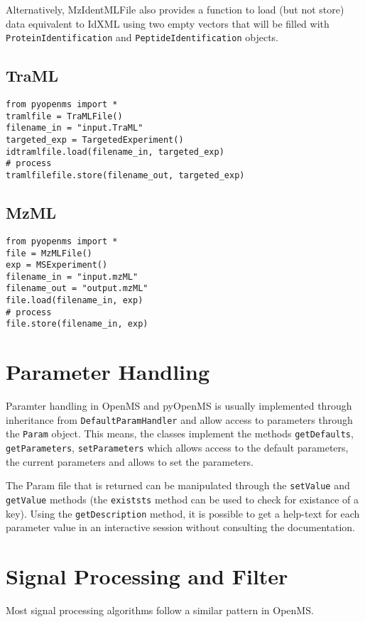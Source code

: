 \documentclass[10pt]{article}
\begin{document}
Alternatively, MzIdentMLFile also provides a function to load (but not store)
data equivalent to IdXML using two empty vectors that will be filled with
\texttt{ProteinIdentification} and \texttt{PeptideIdentification} objects.

\subsection{TraML}
\begin{verbatim}
from pyopenms import *
tramlfile = TraMLFile() 
filename_in = "input.TraML"
targeted_exp = TargetedExperiment()
idtramlfile.load(filename_in, targeted_exp)
# process 
tramlfilefile.store(filename_out, targeted_exp)
\end{verbatim}

\subsection{MzML}
\begin{verbatim}
from pyopenms import *
file = MzMLFile() 
exp = MSExperiment() 
filename_in = "input.mzML"
filename_out = "output.mzML"
file.load(filename_in, exp)
# process 
file.store(filename_in, exp)
\end{verbatim}

\pagebreak
\section{Parameter Handling}

Paramter handling in OpenMS and pyOpenMS is usually implemented through
inheritance from \texttt{DefaultParamHandler} and allow access to parameters
through the \texttt{Param} object. This means, the classes implement the
methods \texttt{getDefaults}, \texttt{getParameters}, \texttt{setParameters}
which allows access to the default parameters, the current parameters and
allows to set the parameters.

The Param file that is returned can be manipulated through the \texttt{setValue} and
\texttt{getValue} methods (the \texttt{existsts} method can be used to check for existance of a
key). Using the \texttt{getDescription} method, it is possible to get a help-text for
each parameter value in an interactive session without consulting the documentation.

\section{Signal Processing and Filter}
Most signal processing algorithms follow a similar pattern in OpenMS.  
\end{document}
